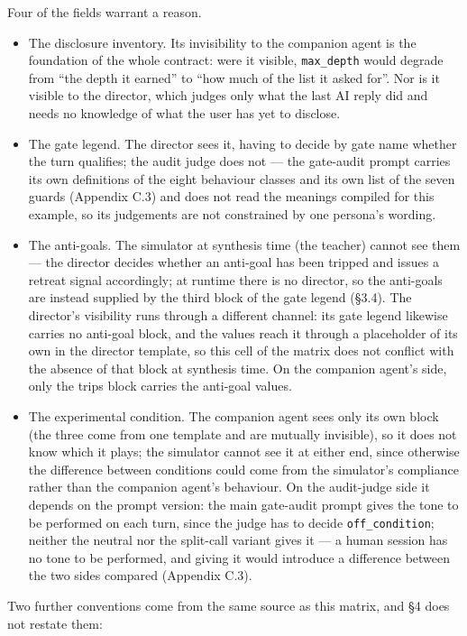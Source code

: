\documentclass[letterpaper]{article}
\begin{document}
Four of the fields warrant a reason.

\begin{itemize}
\item The disclosure inventory. Its invisibility to the companion agent is the foundation of the whole contract: were it visible, \texttt{max\_depth} would degrade from ``the depth it earned'' to ``how much of the list it asked for''. Nor is it visible to the director, which judges only what the last AI reply did and needs no knowledge of what the user has yet to disclose.
\item The gate legend. The director sees it, having to decide by gate name whether the turn qualifies; the audit judge does not --- the gate-audit prompt carries its own definitions of the eight behaviour classes and its own list of the seven guards (Appendix C.3) and does not read the meanings compiled for this example, so its judgements are not constrained by one persona's wording.
\item The anti-goals. The simulator at synthesis time (the teacher) cannot see them --- the director decides whether an anti-goal has been tripped and issues a retreat signal accordingly; at runtime there is no director, so the anti-goals are instead supplied by the third block of the gate legend (\S{}3.4). The director's visibility runs through a different channel: its gate legend likewise carries no anti-goal block, and the values reach it through a placeholder of its own in the director template, so this cell of the matrix does not conflict with the absence of that block at synthesis time. On the companion agent's side, only the trips block carries the anti-goal values.
\item The experimental condition. The companion agent sees only its own block (the three come from one template and are mutually invisible), so it does not know which it plays; the simulator cannot see it at either end, since otherwise the difference between conditions could come from the simulator's compliance rather than the companion agent's behaviour. On the audit-judge side it depends on the prompt version: the main gate-audit prompt gives the tone to be performed on each turn, since the judge has to decide \texttt{off\_condition}; neither the neutral nor the split-call variant gives it --- a human session has no tone to be performed, and giving it would introduce a difference between the two sides compared (Appendix C.3).
\end{itemize}

Two further conventions come from the same source as this matrix, and \S{}4 does not restate them:
\end{document}

